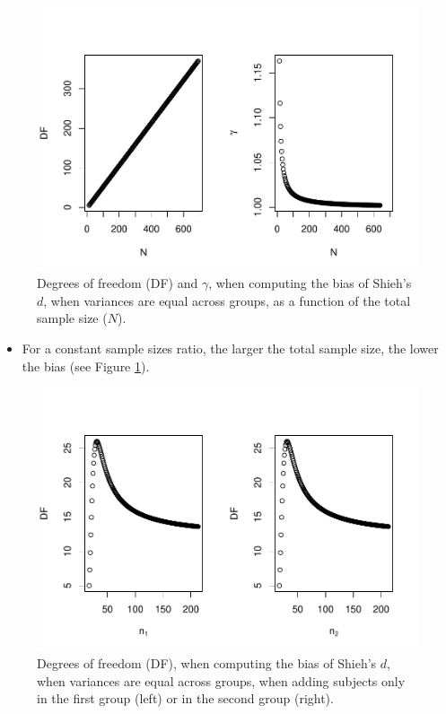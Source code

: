 \documentclass[
  english,
  man,mask]{apa6}
\providecommand{\tightlist}{%
  \setlength{\itemsep}{0pt}\setlength{\parskip}{0pt}}
\begin{document}
\begin{figure}
\centering
\includegraphics{SupMat1_files/figure-latex/biasshiehhomNsize2-1.pdf}
\caption{\label{fig:biasshiehhomNsize2}Degrees of freedom (DF) and \(\gamma\), when computing the bias of Shieh's \(d\), when variances are equal across groups, as a function of the total sample size (\(N\)).}
\end{figure}

\begin{itemize}
\tightlist
\item
  For a constant sample sizes ratio, the larger the total sample size, the lower the bias (see Figure \ref{fig:biasshiehhomNsize2}).
\end{itemize}

\begin{figure}
\centering
\includegraphics{SupMat1_files/figure-latex/biasshiehhomuneqNsize2-1.pdf}
\caption{\label{fig:biasshiehhomuneqNsize2}Degrees of freedom (DF), when computing the bias of Shieh's \(d\), when variances are equal across groups, when adding subjects only in the first group (left) or in the second group (right).}
\end{figure}
\end{document}
